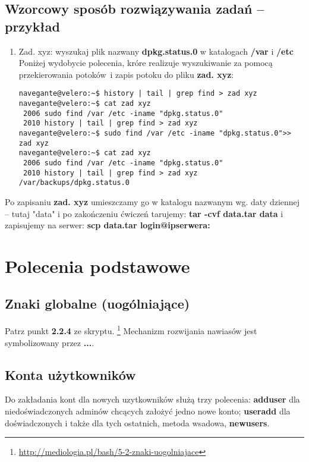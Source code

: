 \documentclass[a4paper,titlepage,12pt]{mwart}
\begin{document}
\subsection{Wzorcowy sposób rozwiązywania zadań -- przykład}
\begin{enumerate}
\item{Zad. xyz: wyszukaj plik nazwany \textbf{dpkg.status.0} w katalogach \textbf{/var} i \textbf{/etc}}
Poniżej wydobycie polecenia, króre realizuje wyszukiwanie za pomocą przekierowania potoków~i zapis potoku do pliku \textbf{zad. xyz}:
\begin{verbatim}
navegante@velero:~$ history | tail | grep find > zad xyz
navegante@velero:~$ cat zad xyz
 2006 sudo find /var /etc -iname "dpkg.status.0"
 2010 history | tail | grep find > zad xyz
navegante@velero:~$ sudo find /var /etc -iname "dpkg.status.0">> zad xyz
navegante@velero:~$ cat zad xyz
 2006 sudo find /var /etc -iname "dpkg.status.0"
 2010 history | tail | grep find > zad xyz
/var/backups/dpkg.status.0
\end{verbatim}
\end{enumerate}
Po zapisaniu \textbf{zad. xyz} umieszczamy go w katalogu nazwanym wg. daty dziennej -- tutaj "data" i po zakończeniu ćwiczeń tarujemy: \textbf{tar -cvf data.tar data} i zapisujemy na serwer: \textbf{scp data.tar login@ipserwera:}
\section{Polecenia podstawowe}
\subsection{Znaki globalne (uogólniające)}
Patrz punkt \textbf{2.2.4} ze skryptu.
\footnote{\url{http://mediologia.pl/bash/5-2-znaki-uogolniajace}}
Mechanizm rozwijania nawiasów jest symbolizowany przez \textbf{...}.
\subsection{Konta użytkowników}
Do zakładania kont dla nowych uzytkowników służą trzy polecenia: \textbf{adduser} dla niedoświadczonych adminów chcących założyć jedno nowe konto; \textbf{useradd} dla doświadczonych i także dla tych ostatnich, metoda wsadowa, \textbf{newusers}.
\end{document}
